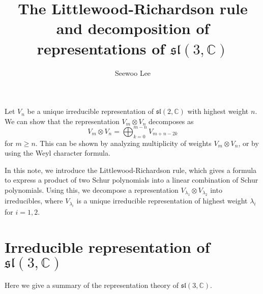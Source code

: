 \documentclass{article}
\title{The Littlewood-Richardson rule and decomposition of representations of $\mathfrak{sl}(3, \mathbb{C})$}
\author{Seewoo Lee}
\begin{document}
\maketitle

Let $V_{n}$ be a unique irreducible representation of $\mathfrak{sl}(2, \mathbb{C})$ with highest weight $n$. We can show that the representation $V_{m}\otimes V_{n}$ decomposes as 
$$
V_{m}\otimes V_{n} = \bigoplus_{k=0}^{m-n} V_{m+n-2k}
$$
for $m\geq n$. This can be shown by analyzing multiplicity of weights $V_{m}\otimes V_{n}$, or by using the Weyl character formula. 

In this note, we introduce the Littlewood-Richardson rule, which gives a formula to express a product of two Schur polynomials into a linear combination of Schur polynomials. Using this, we decompose a representation $V_{\lambda_{1}}\otimes V_{\lambda_{2}}$ into irreducibles, where $V_{\lambda_{i}}$ is a  unique irreducible representation of highest weight $\lambda_{i}$ for $i=1, 2$. 



\section{Irreducible representation of $\mathfrak{sl}(3, \mathbb{C})$}
Here we give a summary of the representation theory of $\mathfrak{sl}(3, \mathbb{C})$. 
\end{document}
